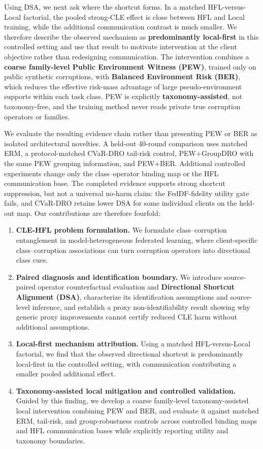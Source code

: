 \documentclass[10pt,twocolumn]{article}
\begin{document}
Using DSA, we next ask where the shortcut forms. In a matched HFL-versus-Local factorial, the pooled strong-CLE effect is close between HFL and Local training, while the additional communication contrast is much smaller. We therefore describe the observed mechanism as \textbf{predominantly local-first} in this controlled setting and use that result to motivate intervention at the client objective rather than redesigning communication. The intervention combines a \textbf{coarse family-level Public Environment Witness (PEW)}, trained only on public synthetic corruptions, with \textbf{Balanced Environment Risk (BER)}, which reduces the effective risk-mass advantage of large pseudo-environment supports within each task class. PEW is explicitly \textbf{taxonomy-assisted}, not taxonomy-free, and the training method never reads private true corruption operators or families.

We evaluate the resulting evidence chain rather than presenting PEW or BER as isolated architectural novelties. A held-out 40-round comparison uses matched ERM, a protocol-matched CVaR-DRO tail-risk control, PEW+GroupDRO with the same PEW grouping information, and PEW+BER. Additional controlled experiments change only the class--operator binding map or the HFL communication base. The completed evidence supports strong shortcut suppression, but not a universal no-harm claim: the FedDF-fidelity utility gate fails, and CVaR-DRO retains lower DSA for some individual clients on the held-out map. Our contributions are therefore fourfold:

\begin{enumerate}
\item \textbf{CLE-HFL problem formulation.} We formulate class--corruption entanglement in model-heterogeneous federated learning, where client-specific class--corruption associations can turn corruption operators into directional class cues.
\item \textbf{Paired diagnosis and identification boundary.} We introduce source-paired operator counterfactual evaluation and \textbf{Directional Shortcut Alignment (DSA)}, characterize its identification assumptions and source-level inference, and establish a proxy non-identifiability result showing why generic proxy improvements cannot certify reduced CLE harm without additional assumptions.
\item \textbf{Local-first mechanism attribution.} Using a matched HFL-versus-Local factorial, we find that the observed directional shortcut is predominantly local-first in the controlled setting, with communication contributing a smaller pooled additional effect.
\item \textbf{Taxonomy-assisted local mitigation and controlled validation.} Guided by this finding, we develop a coarse family-level taxonomy-assisted local intervention combining PEW and BER, and evaluate it against matched ERM, tail-risk, and group-robustness controls across controlled binding maps and HFL communication bases while explicitly reporting utility and taxonomy boundaries.
\end{enumerate}
\end{document}

